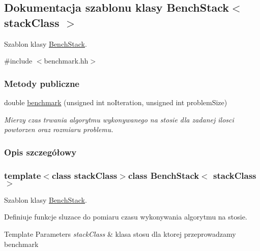 \hypertarget{class_bench_stack}{\subsection{Dokumentacja szablonu klasy Bench\-Stack$<$ stack\-Class $>$}
\label{class_bench_stack}
}


Szablon klasy \hyperlink{class_bench_stack}{Bench\-Stack}.  




{\ttfamily \#include $<$benchmark.\-hh$>$}

\subsubsection*{Metody publiczne}
\begin{DoxyCompactItemize}
\item 
double \hyperlink{class_bench_stack_aa10e491288532a0cce1bb3c2b58df8a8}{benchmark} (unsigned int no\-Iteration, unsigned int problem\-Size)
\begin{DoxyCompactList}\small\item\em Mierzy czas trwania algorytmu wykonywanego na stosie dla zadanej ilosci powtorzen oraz rozmiaru problemu. \end{DoxyCompactList}\end{DoxyCompactItemize}


\subsubsection{Opis szczegółowy}
\subsubsection*{template$<$class stack\-Class$>$class Bench\-Stack$<$ stack\-Class $>$}

Szablon klasy \hyperlink{class_bench_stack}{Bench\-Stack}. 

Definiuje funkcje sluzace do pomiaru czasu wykonywania algorytmu na stosie. 
\begin{DoxyTemplParams}{Template Parameters}
{\em stack\-Class} & klasa stosu dla ktorej przeprowadzamy benchmark \\
\hline
\end{DoxyTemplParams}


